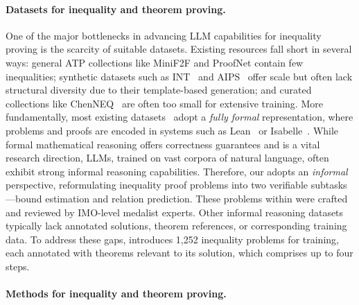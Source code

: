 \paragraph{Datasets for inequality and theorem proving.}
One of the major bottlenecks in advancing LLM capabilities for inequality proving is the scarcity of suitable datasets. Existing resources fall short in several ways: general ATP collections like MiniF2F \cite{zheng2022miniff} and ProofNet \cite{azerbayev2024proofnet} contain few inequalities; synthetic datasets such as INT~\cite{wu2021int} and AIPS~\cite{wei2024proving} offer scale but often lack structural diversity due to their template-based generation; and curated collections like ChenNEQ~\cite{chen2014olympiad} are often too small for extensive training. More fundamentally, most existing datasets~\cite{zhao2025ineq, tung2012inequality, yang2019learning, li2021isarstep, tsoukalas2024putnambench, hu2025minictx} adopt a \textit{fully formal} representation, where problems and proofs are encoded in systems such as Lean~\cite{Moura2015TheLT} or Isabelle~\cite{nipkow2002isabelle}. While formal mathematical reasoning offers correctness guarantees and is a vital research direction, LLMs, trained on vast corpora of natural language, often exhibit strong informal reasoning capabilities. Therefore, our \dataset adopts an \textit{informal} perspective, reformulating inequality proof problems into two verifiable subtasks—bound estimation and relation prediction. These problems within \dataset were crafted and reviewed by IMO-level medalist experts. Other informal reasoning datasets~\cite{petrov2025prooforbluff, mao-etal-2024-champ, gulati2024putnamaxiom, liu2024livemathbench} typically lack annotated solutions, theorem references, or corresponding training data. To address these gaps, \dataset introduces 1,252 inequality problems for training, each annotated with theorems relevant to its solution, which comprises up to four steps.

\vspace{-3mm}
\paragraph{Methods for inequality and theorem proving.} 

